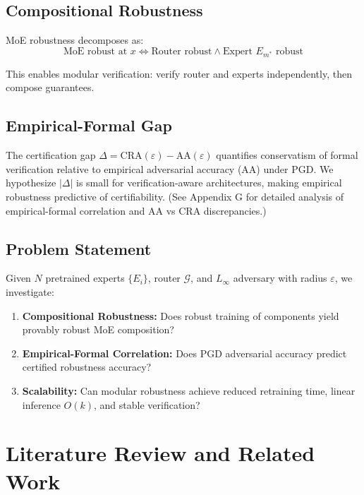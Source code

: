 \documentclass[11pt,a4paper]{article}
\begin{document}
\subsection{Compositional Robustness}

MoE robustness decomposes as:
\begin{equation}
    \text{MoE robust at } x \Longleftrightarrow \text{Router robust} \land \text{Expert } E_{m^*} \text{ robust}
\end{equation}

This enables modular verification: verify router and experts independently, then compose guarantees.

\subsection{Empirical-Formal Gap}

The certification gap $\Delta = \text{CRA}(\varepsilon) - \text{AA}(\varepsilon)$ quantifies conservatism of formal verification relative to empirical adversarial accuracy (AA) under PGD. We hypothesize $|\Delta|$ is small for verification-aware architectures, making empirical robustness predictive of certifiability. (See Appendix G for detailed analysis of empirical-formal correlation and AA vs CRA discrepancies.)

\subsection{Problem Statement}

Given $N$ pretrained experts $\{E_i\}$, router $\mathcal{G}$, and $L_\infty$ adversary with radius $\varepsilon$, we investigate:

\begin{enumerate}
    \item \textbf{Compositional Robustness:} Does robust training of components yield provably robust MoE composition?
    \item \textbf{Empirical-Formal Correlation:} Does PGD adversarial accuracy predict certified robustness accuracy?
    \item \textbf{Scalability:} Can modular robustness achieve reduced retraining time, linear inference $O(k)$, and stable verification?
\end{enumerate}

\section{Literature Review and Related Work}
\end{document}

